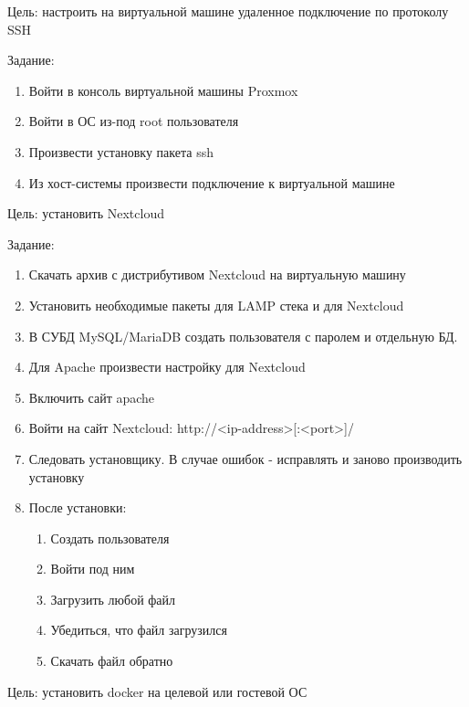 
Цель: настроить на виртуальной машине удаленное подключение по протоколу SSH

Задание:
\begin{enumerate}
    \item Войти в консоль виртуальной машины Proxmox
    \item Войти в ОС из-под root пользователя
    \item Произвести установку пакета ssh
    \item Из хост-системы произвести подключение к виртуальной машине
\end{enumerate}


Цель: установить Nextcloud

Задание:
\begin{enumerate}
    \item Скачать архив с дистрибутивом Nextcloud на виртуальную машину
    \item Установить необходимые пакеты для LAMP стека и для Nextcloud 
    \item В СУБД MySQL/MariaDB создать пользователя с паролем и отдельную БД.
    \item Для Apache произвести настройку для Nextcloud
    \item Включить сайт apache
    \item Войти на сайт Nextcloud: http://<ip-address>[:<port>]/
    \item Следовать установщику. В случае ошибок - исправлять и заново производить установку
    \item После установки:
    \begin{enumerate} 
        \item Создать пользователя
        \item Войти под ним
        \item Загрузить любой файл
        \item Убедиться, что файл загрузился
        \item Скачать файл обратно
    \end{enumerate}
\end{enumerate}



Цель: установить docker на целевой или гостевой ОС

